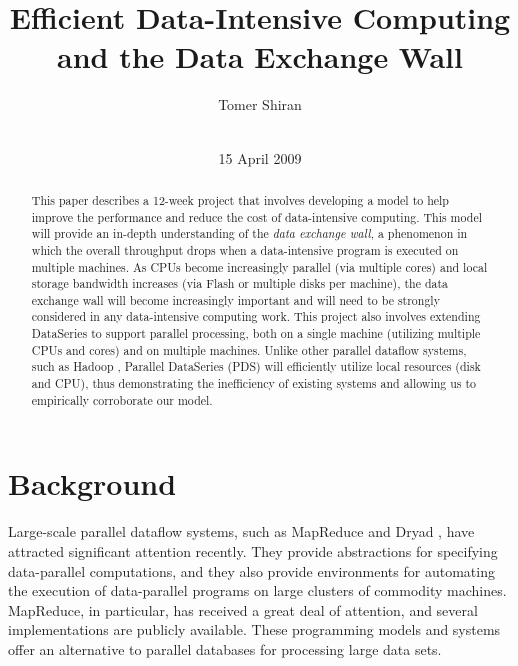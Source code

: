 \documentclass{acm_proc_article-sp}
\begin{document}
\makeatletter
\let\@copyrightspace\relax
\makeatother

\title{Efficient Data-Intensive Computing and the Data Exchange Wall}
\author{
\alignauthor
Tomer Shiran\\
       \\
\and
}
\date{15 April 2009}
\maketitle
\begin{abstract}
This paper describes a 12-week project that involves developing a model to help improve the performance and reduce the cost of data-intensive computing. This model will provide an in-depth understanding of the \emph{data exchange wall}, a phenomenon in which the overall throughput drops when a data-intensive program is executed on multiple machines. As CPUs become increasingly parallel (via multiple cores) and local storage bandwidth increases (via Flash or multiple disks per machine), the data exchange wall will become increasingly important and will need to be strongly considered in any data-intensive computing work. This project also involves extending DataSeries \cite{dataseries} to support parallel processing, both on a single machine (utilizing multiple CPUs and cores) and on multiple machines. Unlike other parallel dataflow systems, such as Hadoop \cite{hadoop}, Parallel DataSeries (PDS) will efficiently utilize local resources (disk and CPU), thus demonstrating the inefficiency of existing systems and allowing us to empirically corroborate our model.
\end{abstract}

\section{Background}
Large-scale parallel dataflow systems, such as MapReduce \cite{mapreduce} and Dryad \cite{dryad}, have attracted significant attention recently. They provide abstractions for specifying data-parallel computations, and they also provide environments for automating the execution of data-parallel programs on large clusters of commodity machines. MapReduce, in particular, has received a great deal of attention, and several implementations \cite{hadoop, phoenix} are publicly available. These programming models and systems offer an alternative to parallel databases \cite{paralleldatabases} for processing large data sets.
\end{document}
